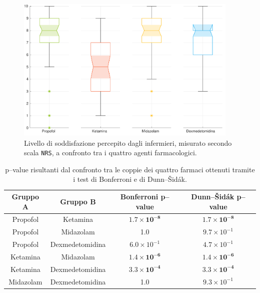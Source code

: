 
\vfill

\begin{figure}[!h]
    \centering
    \includegraphics[width=0.95\textwidth]{Figure/qualita-colorful.pdf}
    \caption{Livello di soddisfazione percepito dagli infermieri, misurato secondo scala \texttt{NRS}, a confronto tra i quattro agenti farmacologici.} %
    \label{fig:qualitascolorful}
\end{figure}

\vfill\vfill


\bgroup
\def\arraystretch{1.5}
\begin{table}[!h]
    \centering
    \begin{tabular}{c|c|c|c}
         Gruppo A & Gruppo B & Bonferroni p--value & Dunn--Šidák p--value\\ \hline
       Propofol & Ketamina & $\mathbf{1.7\times10^{-8}}$ & $\mathbf{1.7\times10^{-8}}$ \\
       Propofol & Midazolam  & 1.0 & $9.7 \times 10^{-1}$\\
       Propofol & Dexmedetomidina & $6.0 \times 10^{-1}$ & $4.7 \times 10^{-1}$\\
       Ketamina & Midazolam & $\mathbf{1.4\times10^{-6}}$ & $\mathbf{1.4\times10^{-6}}$\\
       Ketamina & Dexmedetomidina & $\mathbf{3.3\times10^{-4}}$ & $\mathbf{3.3\times10^{-4}}$\\
       Midazolam & Dexmedetomidina & 1.0 & $9.3 \times 10^{-1}$\\
       
    \end{tabular}
    \caption{p--value risultanti dal confronto tra le coppie dei quattro farmaci ottenuti tramite i test di Bonferroni e di Dunn--Šidák.} %
    \label{tab:qualitatest}
\end{table}
\egroup

